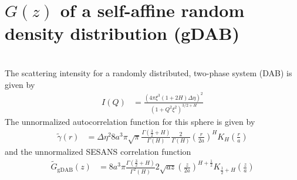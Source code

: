 \section{$G(z)$ of a self-affine random density distribution (gDAB) }~\\
The scattering intensity for a randomly distributed, two-phase system (DAB) is given by \cite{Klimes2002,Hunter2006,Andersson2008}
\begin{align}
I(Q) &= \frac{\left(4 \pi \xi^3 (1+2H) \Delta\eta\right)^2}{ \left(1+Q^2\xi^2\right)^{3/2+H}}
\end{align}
The unnormalized autocorrelation function for this sphere is given by
\begin{align}
\tilde{\gamma}(r) &=
 \Delta\eta^2 8a^3\pi\sqrt{\pi}\frac{\Gamma\left(\frac{3}{2}+H\right)}{\Gamma\left(H\right)}\frac{2}{\Gamma(H)}\left(\frac{r}{2a}\right)^H K_H\left(\frac{r}{a}\right)
\end{align}
and the unnormalized SESANS correlation function
\begin{align}
\tilde{G}_\mathrm{gDAB}(z)&=  8a^3\pi\frac{\Gamma\left(\frac{3}{2}+H\right)}{\Gamma^2\left(H\right)} 2\sqrt{az}\left(\frac{z}{2a}\right)^{H+\frac12}K_{\frac12+H}\left(\frac{z}{a}\right)
\end{align} 


